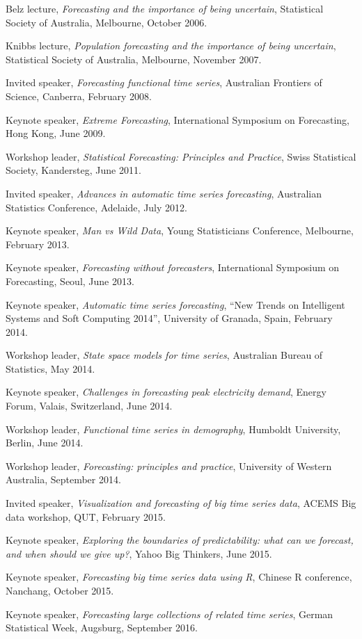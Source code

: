 \documentclass[a4paper,10pt]{article}
\begin{document}
\begin{compactitem}\itemsep=0.1cm
\item Belz lecture, \emph{Forecasting and the importance of being uncertain}, Statistical Society of Australia, Melbourne, October 2006.
\item Knibbs lecture, \emph{Population forecasting and the importance of being uncertain}, Statistical Society of Australia, Melbourne, November 2007.
\item Invited speaker, \emph{Forecasting functional time series}, Australian Frontiers of Science, Canberra, February 2008.
\item Keynote speaker, \emph{Extreme Forecasting}, International Symposium on Forecasting, Hong Kong, June 2009.
\item Workshop leader, \emph{Statistical Forecasting: Principles and Practice}, Swiss Statistical Society, Kandersteg, June 2011.
\item Invited speaker, \emph{Advances in automatic time series forecasting}, Australian Statistics Conference, Adelaide, July 2012.
\item Keynote speaker, \emph{Man vs Wild Data}, Young Statisticians Conference, Melbourne, February 2013.
\item Keynote speaker, \emph{Forecasting without forecasters}, {International Symposium on Forecasting}, Seoul, June 2013.
\item Keynote speaker, \emph{Automatic time series forecasting},  ``New Trends on Intelligent Systems and Soft Computing 2014'', University of Granada, Spain, February 2014.
\item Workshop leader, \emph{State space models for time series}, Australian Bureau of Statistics, May 2014.
\item Keynote speaker, \emph{Challenges in forecasting peak electricity demand}, Energy Forum, Valais, Switzerland, June 2014.
\item Workshop leader, \emph{Functional time series in demography}, Humboldt University, Berlin, June 2014.
\item Workshop leader, \emph{Forecasting: principles and practice}, University of Western Australia, September 2014.
\item Invited speaker, \emph{Visualization and forecasting of big time series data},   ACEMS Big data workshop, QUT, February 2015.
\item Keynote speaker,  \emph{Exploring the boundaries of predictability: what can we forecast, and when should we give up?}, Yahoo Big Thinkers, June 2015.
\item Keynote speaker, \emph{Forecasting big time series data using R}, Chinese R conference, Nanchang, October 2015.
\item Keynote speaker, \emph{Forecasting large collections of related time series}, German Statistical Week, Augsburg, September 2016.
\end{compactitem}
\end{document}
